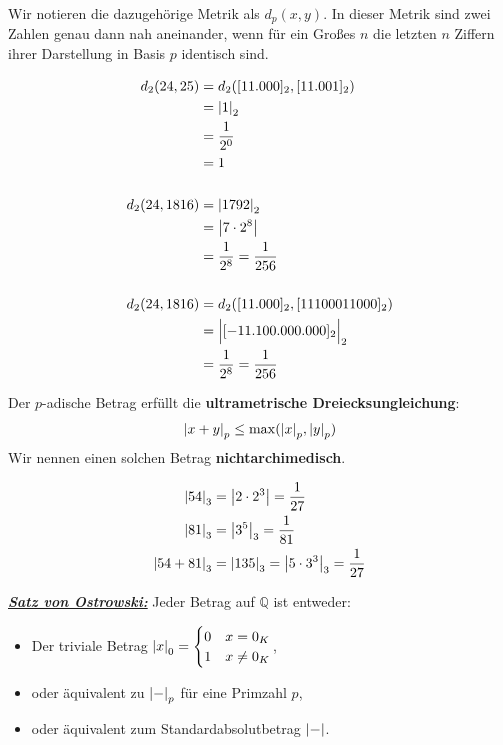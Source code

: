 \documentclass{report}
\newcommand*{\newpar}{\par\vspace{\baselineskip}\noindent}
\newcommand{\tbf}[1]{\textbf{#1}}
\newcommand{\ul}[1]{\underline{#1}}
\newcommand{\theoremname}[1]{\emph{\tbf{\ul{#1}}}}
\newcommand{\bQ}{\mathbb{Q}}
\begin{document}
	\newpar
	Wir notieren die dazugehörige Metrik als $d_p(x,y)$. In dieser Metrik sind zwei Zahlen genau dann nah aneinander, wenn für ein Großes $n$ die letzten $n$ Ziffern ihrer Darstellung in Basis $p$ identisch sind.
	\begin{example}
		\begin{align*}
			d_2(24, 25) &= d_2([11.000]_2,[11.001]_2)\\
			 			&= \abs{1}_2\\ 
			 			&= \frac{1}{2^0}\\ 
			 			&= 1\\\\
			d_2(24, 1816) &= \abs{1792}_2\\ 
						  &= \abs{7 \cdot 2^8}\\
						  &= \frac{1}{2^8} = \frac{1}{256}\\\\
			d_2(24, 1816) &= d_2([11.000]_2, [11100011000]_2)\\
						  &= \Big|[-11.100.000.000]_2\Big|_2\\
						  &= \frac{1}{2^8} = \frac{1}{256}\\
		\end{align*}
	\end{example}
	\begin{theorem}
		Der $p$-adische Betrag erfüllt die \tbf{ultrametrische Dreiecksungleichung}:
		\begin{align*}
			\abs{x + y}_p \leq \max(\abs{x}_p,  \abs{y}_p)
		\end{align*}
		Wir nennen einen solchen Betrag \tbf{nichtarchimedisch}.
	\end{theorem}
	\begin{example}
		\begin{align*}
			\abs{54}_3 &= \abs{2 \cdot 2^3} = \frac{1}{27}\\
			\abs{81}_3 &= \abs{3^5}_3 = \frac{1}{81}\\
			\abs{54 + 81}_3 &= \abs{135}_3 = \abs{5 \cdot 3^3}_3 = \frac{1}{27}
		\end{align*}
	\end{example}
	\begin{proposition}
		\theoremname{Satz von Ostrowski:} Jeder Betrag auf $\bQ$ ist entweder:
		\begin{itemize}
			\item Der triviale Betrag $\abs{x}_0 = 
			\begin{cases}
				0 & x = 0_K\\
				1 & x \neq 0_K\\
			\end{cases}$, 
			\item oder äquivalent zu $\abs{-}_p$ für eine Primzahl $p$, 
			\item oder äquivalent zum Standardabsolutbetrag $\abs{-}$.
		\end{itemize} 
	\end{proposition}
\end{document}
